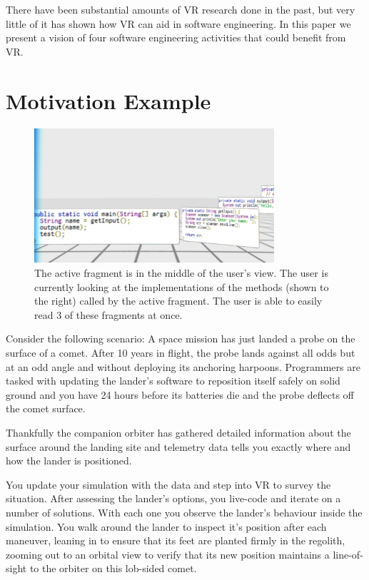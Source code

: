 \documentclass[conference]{IEEEtran}
\begin{document}
There have been substantial amounts of VR research done in the past, but very little of it has shown how VR can aid in software engineering. 
In this paper we present a vision of four software engineering activities that could benefit from VR.

\section{Motivation Example}

\begin{figure}[ht]
\centering
\includegraphics[width=\textwidth,height=5cm]{figures/unwarpped_stack}
\caption{The active fragment is in the middle of the user's view. The user is currently looking at the implementations of the methods (shown to the right) called by the active fragment. The user is able to easily read 3 of these fragments at once.  \label{immersion}}
\end{figure}


Consider the following scenario: A space mission has just landed a probe on the surface of a comet.
After 10 years in flight, the probe lands against all odds but at an odd angle and without deploying its anchoring harpoons. 
Programmers are tasked with updating the lander's software to reposition itself safely on solid ground and you have 24 hours before its batteries die and the probe deflects off the comet surface.

Thankfully the companion orbiter has gathered detailed information about the surface around the landing site and telemetry data tells you exactly where and how the lander is positioned. 

You update your simulation with the data and step into VR to survey the situation. 
After assessing the lander's options, you live-code and iterate on a number of solutions. 
With each one you observe the lander's behaviour inside the simulation. 
You walk around the lander to inspect it's position after each maneuver, leaning in to ensure that its feet are planted firmly in the regolith, zooming out to an orbital view to verify that its new position maintains a line-of-sight to the orbiter on this lob-sided comet. 
\end{document}
